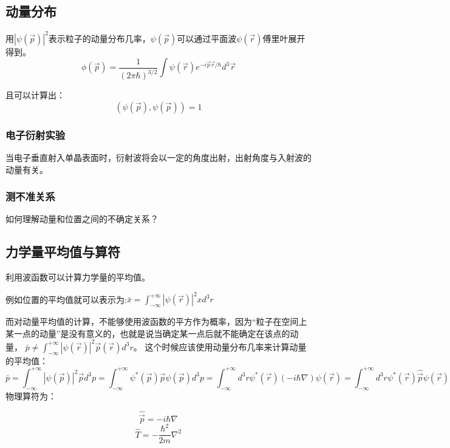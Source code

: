 \subsection{动量分布}
用$|\psi(\vec{p})|^2$表示粒子的动量分布几率，$\psi(\vec{p})$可以通过平面波$\psi(\vec{r})$傅里叶展开得到。
\begin{equation}
    \phi(\vec{p})=\frac{1}{(2\pi \hbar)^{3/2}}\int \psi(\vec{r}) e^ { -i \vec{p}\vec{r} / \hbar }d^3 \vec{r}
\end{equation}

且可以计算出：\\
\begin{equation}
    (\psi(\vec{p}),\psi(\vec{p}))=1
\end{equation}

\subsubsection{电子衍射实验}
当电子垂直射入单晶表面时，衍射波将会以一定的角度出射，出射角度与入射波的动量有关。

\subsubsection{测不准关系}
如何理解动量和位置之间的不确定关系？

\subsection{力学量平均值与算符}
利用波函数可以计算力学量的平均值。

例如位置的平均值就可以表示为:$\bar{x}=\int_{-\infty} ^{+\infty} |\psi(\vec{r})|^2x d^3r$

而对动量平均值的计算，不能够使用波函数的平方作为概率，因为“粒子在空间上某一点的动量”是没有意义的，也就是说当确定某一点后就不能确定在该点的动量，
$\bar{p}\neq \int_{-\infty} ^{+\infty} |\psi(\vec{r})|^2\vec{p}(\vec{r}) d^3r$。
这个时候应该使用动量分布几率来计算动量的平均值：
\begin{equation}
    \bar{p} = \int_{-\infty} ^{+\infty} |\psi(\vec{p})|^2\vec{p} d^3p=\int_{-\infty} ^{+\infty} \psi^*(\vec{p}) \vec{p}\psi(\vec{p})  d^3p
    =\int_{-\infty} ^{+\infty}  d^3r \psi^*(\vec{r})(-i\hbar \nabla)\psi(\vec{r}) 
    =\int_{-\infty} ^{+\infty}  d^3r \psi^*(\vec{r}) \hat{\vec{p}} \psi(\vec{r}) 
\end{equation}
物理算符为：

\begin{equation}
     \hat{\vec{p}}=-i\hbar \nabla
\end{equation}
\begin{equation}
    \hat{T}=-\frac{\hbar^2}{2m}\nabla^2
\end{equation}

